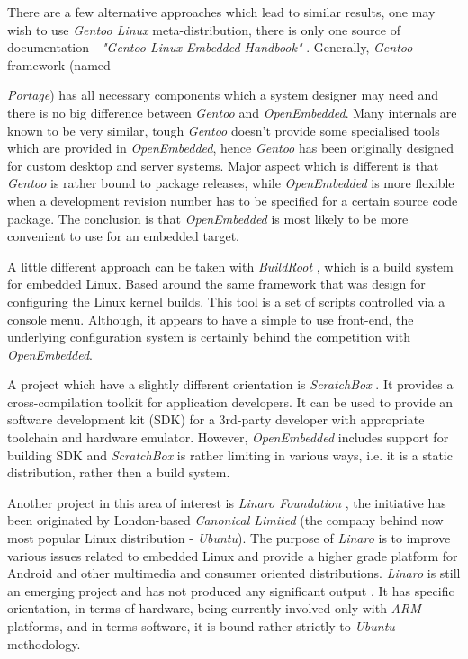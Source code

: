   There are a few alternative approaches which lead to similar results,
 one may wish to use \emph{Gentoo Linux} meta-distribution, there
 is only one source of documentation - \emph{"Gentoo Linux Embedded
 Handbook"} \cite{links:gentoo:embedded}. Generally, \emph{Gentoo}
 framework (named {\emph{Portage}) has all necessary components
 which a system designer may need and there is no big difference
 between \emph{Gentoo} and \emph{OpenEmbedded}. Many internals
 are known to be very similar, tough \emph{Gentoo} doesn't provide
 some specialised tools which are provided in \emph{OpenEmbedded},
 hence \emph{Gentoo} has been originally designed for custom
 desktop and server systems. Major aspect which is different is
 that \emph{Gentoo} is rather bound to package releases, while
 \emph{OpenEmbedded} is more flexible when a development revision
 number has to be specified for a certain source code package.
 The conclusion is that \emph{OpenEmbedded} is most likely to be
 more convenient to use for an embedded target.
 
  A little different approach can be taken with \emph{BuildRoot}
 \cite{links:buildroot:homepage}, which is a build system for
 embedded Linux. Based around the same framework that was design
 for configuring the Linux kernel builds. This tool is a set of
 scripts controlled via a console menu. Although, it appears to
 have a simple to use front-end, the underlying configuration
 system is certainly behind the competition with \emph{OpenEmbedded}.

  A project which have a slightly different orientation is
 \emph{ScratchBox} \cite{links:sbox:homepage}. It provides
 a cross-compilation toolkit for application developers.
 It can be used to provide an software development kit (SDK)
 for a 3rd-party developer with appropriate toolchain and
 hardware emulator. However, \emph{OpenEmbedded} includes
 support for building SDK and \emph{ScratchBox} is rather
 limiting in various ways, i.e. it is a static distribution,
 rather then a build system.
 
  Another project in this area of interest is \emph{Linaro Foundation}
 \cite{links:linaro:homepage}, the initiative has been originated by
 London-based \emph{Canonical Limited} (the company behind now most
 popular Linux distribution - \emph{Ubuntu}).
 The purpose of \emph{Linaro} is to improve various issues related to
 embedded Linux and provide a higher grade platform for Android and
 other multimedia and consumer oriented distributions. \emph{Linaro} is
 still an emerging project and has not produced any significant output
 \cite{links:linaro:homepage}. It has specific orientation, in terms of
 hardware, being currently involved only with \emph{ARM} platforms,
 and in terms software, it is bound rather strictly to \emph{Ubuntu}
 methodology.

}
